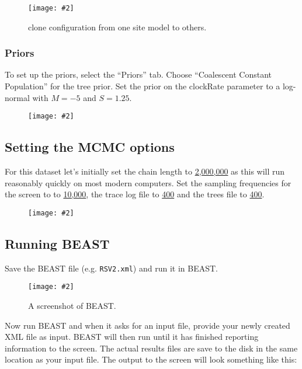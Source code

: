 \documentclass[12pt]{article}
\newcommand{\includeimage}[2][]{%
\texttt{[image: \#2]}
}
\newcommand{\chainLength}{{2,000,000}}
\newcommand{\logEvery}{{400}}
\newcommand{\screenEvery}{{10,000}}
\begin{document}
\begin{figure}
\centering	
\includeimage[width=0.9\textwidth]{figures/cloneFrom}
\caption{clone configuration from one site model to others.}
\label{fig:cloneFrom}
\end{figure}


\subsubsection{Priors }

To set up the priors, select the ``Priors'' tab.
Choose ``Coalescent Constant Population'' for the tree prior. Set the prior on the clockRate parameter to a log-normal with $M=-5$ and $S=1.25$. 

\begin{figure}
\centering	
\includeimage[width=0.8\textwidth]{figures/BEAUti_priors}
\label{fig:BEAUti_priors}
\end{figure}


\subsection{Setting the MCMC options}

For this dataset let's initially set the chain length to \underline{\chainLength{}} as this will run 
reasonably quickly on most modern computers. Set the sampling frequencies for the screen to
to \underline{\screenEvery{}}, the trace log file to \underline{\logEvery{}} and the trees file to \underline{\logEvery{}}.

\begin{figure}
\centering	
\includeimage[width=0.8\textwidth]{figures/BEAUti_mcmc}
\label{fig:BEAUti_mcmc}
\end{figure}


\subsection*{Running BEAST}

Save the BEAST file (e.g. \texttt{RSV2.xml}) and run it in BEAST.

\begin{figure}
\centering	
\includeimage[width=0.7\textwidth]{figures/BEAST}
\caption{A screenshot of BEAST.}
\label{fig:BEAST}
\end{figure}

Now run BEAST and when it asks for an input file, provide your newly
created XML file as input. BEAST will then run until it has finished
reporting information to the screen. The actual results files are
save to the disk in the same location as your input file. The output to the screen will
look something like this: 
\end{document}
